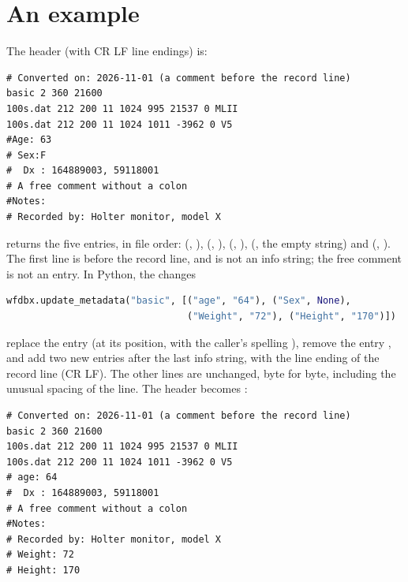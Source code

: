 \section{An example}
\label{sec:metadata-example}

The header  (with CR LF line endings)
is:
\begin{lstlisting}[style=text]
# Converted on: 2026-11-01 (a comment before the record line)
basic 2 360 21600
100s.dat 212 200 11 1024 995 21537 0 MLII
100s.dat 212 200 11 1024 1011 -3962 0 V5
#Age: 63
# Sex:F
#  Dx : 164889003, 59118001
# A free comment without a colon
#Notes:
# Recorded by: Holter monitor, model X
\end{lstlisting}
 returns the five entries, in file order:
(, ), (, ), (,
), (, the empty string) and
(, ). The first line is
before the record line, and is not an info string; the free comment is not
an entry. In Python, the changes
\begin{lstlisting}[language=Python]
wfdbx.update_metadata("basic", [("age", "64"), ("Sex", None),
                                ("Weight", "72"), ("Height", "170")])
\end{lstlisting}
replace the entry  (at its position, with the caller's spelling
), remove the entry , and add two new entries after the
last info string, with the line ending of the record line (CR LF). The other
lines are unchanged, byte for byte, including the unusual spacing of the
 line. The header becomes
:
\begin{lstlisting}[style=text]
# Converted on: 2026-11-01 (a comment before the record line)
basic 2 360 21600
100s.dat 212 200 11 1024 995 21537 0 MLII
100s.dat 212 200 11 1024 1011 -3962 0 V5
# age: 64
#  Dx : 164889003, 59118001
# A free comment without a colon
#Notes:
# Recorded by: Holter monitor, model X
# Weight: 72
# Height: 170
\end{lstlisting}

